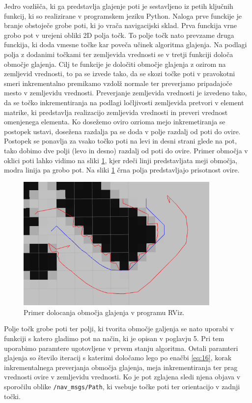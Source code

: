 \documentclass[10pt,a4paper]{article}
\begin{document}
Jedro vozlišča, ki ga predstavlja glajenje poti je sestavljeno iz petih ključnih funkcij, ki so realizirane v programskem jeziku Python. Naloga prve funckije je branje obstoječe grobe poti, ki jo vrača navigacijski sklad. Prva funckija vrne grobo pot v urejeni obliki 2D polja točk. To polje točk nato prevzame druga funckija, ki doda vmesne točke kar poveča učinek algoritma glajenja. Na podlagi polja z dodanimi točkami ter zemljevida vrednosti se v tretji funkciji določa območje glajenja. Cilj te funkcije je določiti območje glajenja z ozirom na zemljevid vrednosti, to pa se izvede tako, da se skozi točke poti v pravokotni smeri inkrementalno premikamo vzdolž normale ter preverjamo pripadajoče mesto v zemljevidu vrednosti. Preverjanje zemljevida vrednosti je izvedeno tako, da se točko inkrementiranja na podlagi ločljivosti zemljevida pretvori v element matrike, ki predstavlja realizacijo zemljevida vrednosti in preveri vrednost omenjenega elementa. Ko dosežemo oviro ozrioma mejo inkremetiranja se postopek ustavi, dosežena razdalja pa se doda v polje razdalj od poti do ovire. Postopek se ponavlja za vsako točko poti na levi in desni strani glede na pot, tako dobimo dve polji (levo in desno) razdalj od poti do ovire. Primer območja v oklici poti lahko vidimo na sliki \ref{fig:slika_obm}, kjer rdeči linji predstavljata meji območja, modra linija pa grobo pot. Na sliki \ref{fig:slika_obm} črna polja predstavljajo prisotnost ovire.

\begin{figure}[H]
	\centering
	\includegraphics[width=10cm]{pic/obmocje.png}
	\caption{Primer dolocanja območja glajenja v programu RViz.}
	\label{fig:slika_obm}
\end{figure}

Polje točk grobe poti ter polji, ki tvorita območje galjenja se nato uporabi v funkciji s katero gladimo pot na način, ki je opisan v poglavju 5. Pri tem uporabimo paramtere ugotovljene v prvem stanju algoritma. Ostali paramteri glajenja so število iteracij s katerimi določamo lego po enačbi \ref{eq:16}, korak inkrementalnega preverjanja območja glajenja, meja inkrementiranja ter prag vrednosti ovire v zemljevidu vrednosti. Ko je pot zglajena sledi njena objava v sporočilu oblike \verb|/nav_msgs/Path|, ki vsebuje točke poti ter orientacijo v zadnji točki.
\end{document}
